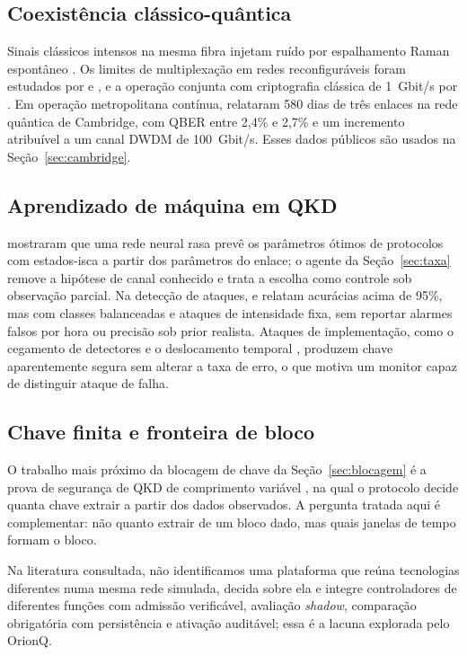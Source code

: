 \documentclass[12pt]{article}
\providecommand{\citeasnoun}[1]{\cite{#1}}
\begin{document}
\subsection{Coexistência clássico-quântica}

Sinais clássicos intensos na mesma fibra injetam ruído por espalhamento Raman
espontâneo \cite{kumar2015}. Os limites de multiplexação em redes
reconfiguráveis foram estudados por \citeasnoun{peters2009} e
\citeasnoun{chapuran2009}, e a operação conjunta com criptografia clássica de
1~Gbit/s por \citeasnoun{eraerds2010}. Em operação metropolitana contínua,
\citeasnoun{dynes2019} relataram 580 dias de três enlaces na rede quântica de
Cambridge, com QBER entre 2,4\% e 2,7\% e um incremento atribuível a um canal
DWDM de 100~Gbit/s. Esses dados públicos são usados na
Seção~\ref{sec:cambridge}.

\subsection{Aprendizado de máquina em QKD}

\citeasnoun{wang2019} mostraram que uma rede neural rasa prevê os parâmetros
ótimos de protocolos com estados-isca a partir dos parâmetros do enlace; o
agente da Seção~\ref{sec:taxa} remove a hipótese de canal conhecido e trata a
escolha como controle sob observação parcial. Na detecção de ataques,
\citeasnoun{mao2020} e \citeasnoun{xu2024} relatam acurácias acima de 95\%, mas
com classes balanceadas e ataques de intensidade fixa, sem reportar alarmes
falsos por hora ou precisão sob prior realista. Ataques de implementação, como
o cegamento de detectores \cite{lydersen2010} e o deslocamento temporal
\cite{zhao2008}, produzem chave aparentemente segura sem alterar a taxa de
erro, o que motiva um monitor capaz de distinguir ataque de falha.

\subsection{Chave finita e fronteira de bloco}

O trabalho mais próximo da blocagem de chave da Seção~\ref{sec:blocagem} é a
prova de segurança de QKD de comprimento variável \cite{tupkary2024}, na qual o
protocolo decide quanta chave extrair a partir dos dados observados. A pergunta
tratada aqui é complementar: não quanto extrair de um bloco dado, mas quais
janelas de tempo formam o bloco.

Na literatura consultada, não identificamos uma plataforma que reúna
tecnologias diferentes numa mesma rede simulada, decida sobre ela e integre
controladores de diferentes funções com admissão verificável, avaliação
\textit{shadow}, comparação obrigatória com persistência e ativação auditável;
essa é a lacuna explorada pelo OrionQ.
\end{document}
